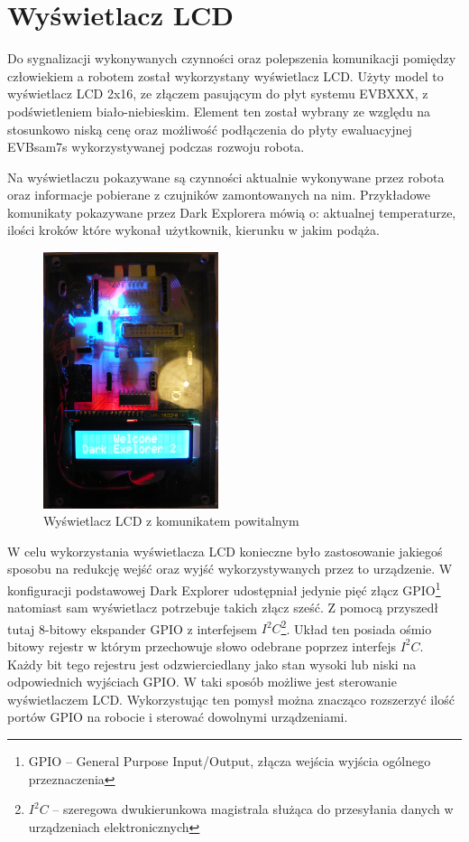 \section{Wyświetlacz LCD}
Do sygnalizacji wykonywanych czynności oraz polepszenia komunikacji pomiędzy człowiekiem a robotem został wykorzystany wyświetlacz LCD. Użyty model to wyświetlacz LCD 2x16, ze złączem pasującym do płyt systemu EVBXXX, z podświetleniem biało-niebieskim. Element ten został wybrany ze względu na stosunkowo niską cenę oraz możliwość podłączenia do płyty ewaluacyjnej EVBsam7s wykorzystywanej podczas rozwoju robota.

Na wyświetlaczu pokazywane są czynności aktualnie wykonywane przez robota oraz informacje pobierane z czujników zamontowanych na nim. Przykładowe komunikaty pokazywane przez Dark Explorera mówią o: aktualnej temperaturze, ilości kroków które wykonał użytkownik, kierunku w jakim podąża.

\begin{figure}[!ht]
 \centering
 \includegraphics[height=75mm]{../images/ch04/lcd_welcome.jpg}
 \caption{Wyświetlacz LCD z komunikatem powitalnym}
 \label{fig:LCD}
\end{figure}

W celu wykorzystania wyświetlacza LCD konieczne było zastosowanie jakiegoś sposobu na redukcję wejść oraz wyjść wykorzystywanych przez to urządzenie. W konfiguracji podstawowej Dark Explorer udostępniał jedynie pięć złącz GPIO\footnote{GPIO -- General Purpose Input/Output, złącza wejścia wyjścia ogólnego przeznaczenia} natomiast sam wyświetlacz potrzebuje takich złącz sześć. Z pomocą przyszedł tutaj 8-bitowy ekspander GPIO z interfejsem $I^{2}C$\footnote{$I^{2}C$ -- szeregowa dwukierunkowa magistrala służąca do przesyłania danych w urządzeniach elektronicznych}. Układ ten posiada ośmio bitowy rejestr w którym przechowuje słowo odebrane poprzez interfejs $I^{2}C$. Każdy bit tego rejestru jest odzwierciedlany jako stan wysoki lub niski na odpowiednich wyjściach GPIO. W taki sposób możliwe jest sterowanie wyświetlaczem LCD. Wykorzystując ten pomysł można znacząco rozszerzyć ilość portów GPIO na robocie i sterować dowolnymi urządzeniami.

